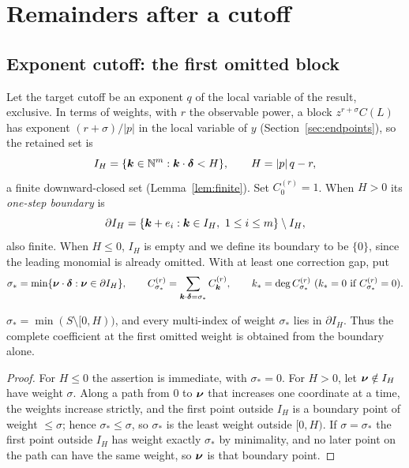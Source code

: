 \section{Remainders after a cutoff}
\label{sec:remainders}

\subsection{Exponent cutoff: the first omitted block}

Let the target cutoff be an exponent $q$ of the local variable of the result, exclusive. In terms of weights, with $r$ the observable power, a block $z^{r+\sigma}C(L)$ has exponent $(r+\sigma)/|p|$ in the local variable of $y$ (Section~\ref{sec:endpoints}), so the retained set is
\begin{equation}
 I_H=\{\boldsymbol k\in\mathbb N^m:\boldsymbol k\cdot\boldsymbol\delta<H\},\qquad H=|p|\,q-r ,
 \label{eq:IH}
\end{equation}
a finite downward-closed set (Lemma~\ref{lem:finite}). Set $C^{(r)}_0=1$. When $H>0$ its \emph{one-step boundary} is
\begin{equation}
 \partial I_H=\{\boldsymbol k+e_i:\boldsymbol k\in I_H,\ 1\le i\le m\}\setminus I_H ,
 \label{eq:boundary}
\end{equation}
also finite. When $H\le0$, $I_H$ is empty and we define its boundary to be $\{0\}$, since the leading monomial is already omitted. With at least one correction gap, put
\begin{equation}
 \sigma_*=\min\{\boldsymbol\nu\cdot\boldsymbol\delta:\boldsymbol\nu\in\partial I_H\},\qquad
 C^{(r)}_{\sigma_*}=\sum_{\boldsymbol k\cdot\boldsymbol\delta=\sigma_*}C^{(r)}_{\boldsymbol k},\qquad k_*=\deg C^{(r)}_{\sigma_*}\ (k_*=0\text{ if }C^{(r)}_{\sigma_*}=0).
 \label{eq:frontier-data}
\end{equation}

\begin{lemma}
\label{lem:frontier}
$\sigma_*=\min(S\setminus[0,H))$, and every multi-index of weight $\sigma_*$ lies in $\partial I_H$. Thus the complete coefficient at the first omitted weight is obtained from the boundary alone.
\end{lemma}
\begin{proof}
For $H\le0$ the assertion is immediate, with $\sigma_*=0$. For $H>0$, let $\boldsymbol\nu\notin I_H$ have weight $\sigma$. Along a path from $0$ to $\boldsymbol\nu$ that increases one coordinate at a time, the weights increase strictly, and the first point outside $I_H$ is a boundary point of weight $\le\sigma$; hence $\sigma_*\le\sigma$, so $\sigma_*$ is the least weight outside $[0,H)$. If $\sigma=\sigma_*$ the first point outside $I_H$ has weight exactly $\sigma_*$ by minimality, and no later point on the path can have the same weight, so $\boldsymbol\nu$ is that boundary point.
\end{proof}


